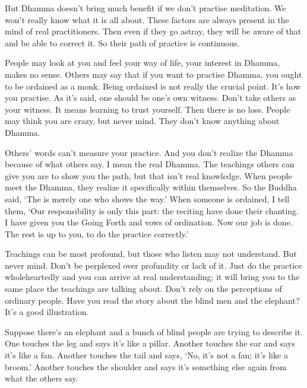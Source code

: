 But Dhamma doesn't bring much benefit if we don't practise meditation. We won't really know what it is all about. These factors are always present in the mind of real practitioners. Then even if they go astray, they will be aware of that and be able to correct it. So their path of practice is continuous. 

People may look at you and feel your way of life, your interest in Dhamma, makes no sense. Others may say that if you want to practise Dhamma, you ought to be ordained as a monk. Being ordained is not really the crucial point. It's how you practise. As it's said, one should be one's own witness. Don't take others as your witness. It means learning to trust yourself. Then there is no loss. People may think you are crazy, but never mind. They don't know anything about Dhamma. 

Others' words can't measure your practice. And you don't realize the Dhamma because of what others say. I mean the real Dhamma. The teachings others can give you are to show you the path, but that isn't real knowledge. When people meet the Dhamma, they realize it specifically within themselves. So the Buddha said, `The  is merely one who shows the way.' When someone is ordained, I tell them, `Our responsibility is only this  part: the reciting  have done their chanting. I have given you the Going Forth and vows of ordination. Now our job is done. The rest is up to you, to do the practice correctly.' 

Teachings can be most profound, but those who listen may not understand. But never mind. Don't be perplexed over profundity or lack of it. Just do the practice wholeheartedly and you can arrive at real understanding; it will bring you to the same place the teachings are talking about. Don't rely on the perceptions of ordinary people. Have you read the story about the blind men and the elephant? It's a good illustration. 

Suppose there's an elephant and a bunch of blind people are trying to describe it. One touches the leg and says it's like a pillar. Another touches the ear and says it's like a fan. Another touches the tail and says, `No, it's not a fan; it's like a broom.' Another touches the shoulder and says it's something else again from what the others say. 

